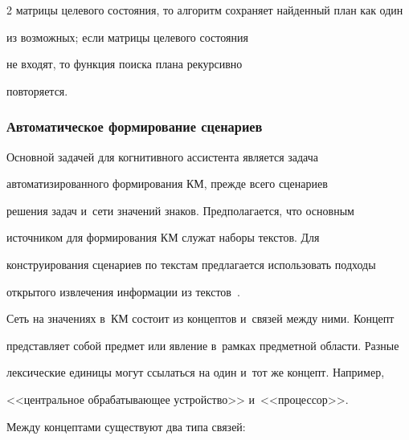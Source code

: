 \begin{multicols}{2}
матрицы целевого состояния, то алгоритм сохраняет найденный план как один 


из возможных; если мат\-ри\-цы целевого со\-сто\-яния


не входят, то функция поиска плана рекурсивно 


повторяется.





  




  


  \subsubsection{Автоматическое формирование сценариев} %


  




  


   Основной задачей для когнитивного ассистента является задача 


автоматизированного формирования КМ, прежде всего сценариев 


решения задач и~сети значений знаков. Предполагается, что основным 


источником для формирования КМ служат наборы текстов. Для 


конструирования сценариев по текстам предлагается использовать подходы 


открытого извлечения информации из текстов~\cite{6-sm, 7-sm}.





  


  Сеть на значениях в~КМ состоит из концептов и~связей между ними. Концепт 


представляет собой предмет или явление в~рамках предметной области. Разные 


лексические единицы могут ссылаться на один и~тот же концепт. Например, 


<<центральное обрабатывающее устройство>> и~<<процессор>>. 


  


  Между концептами существуют два типа связей:


  \begin{enumerate}[(1)]



\end{enumerate}
\end{multicols}

